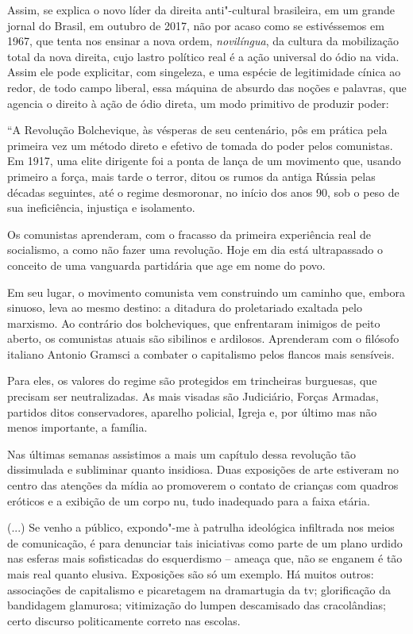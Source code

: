 Assim, se explica o novo líder da direita anti"-cultural brasileira, em
um grande jornal do Brasil, em outubro de 2017, não por acaso como se
estivéssemos em 1967, que tenta nos ensinar a nova ordem,
\emph{novilíngua}, da cultura da mobilização total da nova direita, cujo
lastro político real é a ação universal do ódio na vida. Assim ele pode
explicitar, com singeleza, e uma espécie de legitimidade cínica ao
redor, de todo campo liberal, essa máquina de absurdo das noções e
palavras, que agencia o direito à ação de ódio direta, um modo primitivo
de produzir poder:

``A Revolução Bolchevique, às vésperas de seu centenário, pôs em prática
pela primeira vez um método direto e efetivo de tomada do poder pelos
comunistas. Em 1917, uma elite dirigente foi a ponta de lança de um
movimento que, usando primeiro a força, mais tarde o terror, ditou os
rumos da antiga Rússia pelas décadas seguintes, até o regime desmoronar,
no início dos anos 90, sob o peso de sua ineficiência, injustiça e
isolamento.

Os comunistas aprenderam, com o fracasso da primeira experiência real de
socialismo, a como não fazer uma revolução. Hoje em dia está
ultrapassado o conceito de uma vanguarda partidária que age em nome do
povo.

Em seu lugar, o movimento comunista vem construindo um caminho que,
embora sinuoso, leva ao mesmo destino: a ditadura do proletariado
exaltada pelo marxismo. Ao contrário dos bolcheviques, que enfrentaram
inimigos de peito aberto, os comunistas atuais são sibilinos e
ardilosos. Aprenderam com o filósofo italiano Antonio Gramsci a combater
o capitalismo pelos flancos mais sensíveis.

Para eles, os valores do regime são protegidos em trincheiras burguesas,
que precisam ser neutralizadas. As mais visadas são Judiciário, Forças
Armadas, partidos ditos conservadores, aparelho policial, Igreja e, por
último mas não menos importante, a família.

Nas últimas semanas assistimos a mais um capítulo dessa revolução tão
dissimulada e subliminar quanto insidiosa. Duas exposições de arte
estiveram no centro das atenções da mídia ao promoverem o contato de
crianças com quadros eróticos e a exibição de um corpo nu, tudo
inadequado para a faixa etária.

(...) Se venho a público, expondo"-me à patrulha ideológica infiltrada
nos meios de comunicação, é para denunciar tais iniciativas como parte
de um plano urdido nas esferas mais sofisticadas do esquerdismo -- ameaça
que, não se enganem é tão mais real quanto elusiva. Exposições são só um
exemplo. Há muitos outros: associações de capitalismo e picaretagem na
dramartugia da tv; glorificação da bandidagem glamurosa; vitimização do
lumpen descamisado das cracolândias; certo discurso politicamente
correto nas escolas.


